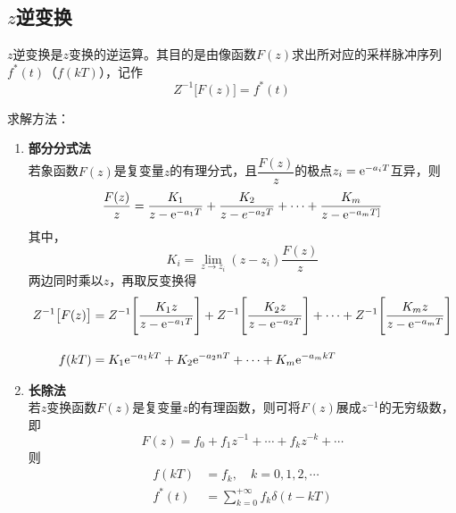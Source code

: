 \subsection{$z$逆变换}
$z$逆变换是$z$变换的逆运算。其目的是由像函数$F(z)$求出所对应的采样脉冲序列$f^*(t)$（$f(kT)$），记作
\begin{equation}
	Z^{-1}\big[F(z)\big] = f^*(t)
\end{equation}
\vspace*{-2em}


\noindent 求解方法：
\begin{enumerate}[\textbf{方法} 1 ]
	\item \textbf{部分分式法}\\
	若象函数$F(z)$是复变量$z$的有理分式，且$\dfrac{F(z)}{z}$的极点$z_i = {\rm{e}}^{-a_iT}$互异，则
	\begin{equation}
		\dfrac{F(z)}{z} = \dfrac{K_1}{z - {\rm{e}}^{-a_1T}} + \dfrac{K_2}{z - e^{-a_2T}} + \cdots + \dfrac{K_m}{z - {\rm{e}}^{-a_mT]}}
	\end{equation}
	其中，
	\begin{equation}
		K_i = \lim\limits_{z \to z_i} (z - z_i) \dfrac{F(z)}{z}
	\end{equation}
	两边同时乘以$z$，再取反变换得
	\begin{align}
		Z^{-1}\big[F(z)\big] &= Z^{-1}\Bigg[\dfrac{K_1z}{z-{\rm{e}}^{-a_1T}}\Bigg] + Z^{-1}\Bigg[\dfrac{K_2z}{z-{\rm{e}}^{-a_2T}}\Bigg] + \cdots + Z^{-1}\Bigg[\dfrac{K_mz}{z-{\rm{e}}^{-a_mT}}\Bigg]\\[1em]
		f(kT) &= K_1{\rm{e}}^{-a_1kT} + K_2 {\rm{e}}^{-a_2nT} + \cdots + K_m{\rm{e}}^{-a_mkT}
	\end{align}
	
	\item \textbf{长除法}\\
	若$z$变换函数$F(z)$是复变量$z$的有理函数，则可将$F(z)$展成$z^{-1}$的无穷级数，即
	\begin{equation}
		F(z) = f_0 + f_1z^{-1} + \cdots + f_k z^{-k} + \cdots
	\end{equation}
	则
	\begin{align}
		f(kT) &= f_k, \quad k = 0,1,2,\cdots\\
		f^*(t) &= \sum_{k = 0}^{+ \infty}f_k \delta(t - kT)
	\end{align}
	

\end{enumerate}
